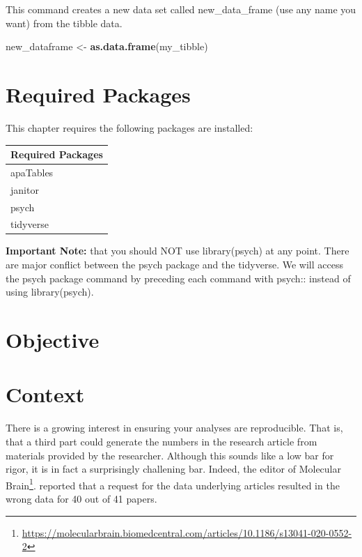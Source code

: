 \documentclass[
]{krantz}
\makeatletter
\newenvironment{Shaded}{\begin{snugshade}}{\end{snugshade}}
\newcommand{\KeywordTok}[1]{\textcolor[rgb]{0.27,0.27,0.27}{\textbf{#1}}}
\newcommand{\NormalTok}[1]{#1}
\newcommand{\StringTok}[1]{\textcolor[rgb]{0.5,0.5,0.5}{#1}}
\renewcommand{\href}[2]{#2\footnote{\url{#1}}}
\newenvironment{kframe}{%
\medskip{}
\setlength{\fboxsep}{.8em}
 \def\at@end@of@kframe{}%
 \ifinner\ifhmode%
  \def\at@end@of@kframe{\end{minipage}}%
  \begin{minipage}{\columnwidth}%
 \fi\fi%
 \def\FrameCommand##1{\hskip\@totalleftmargin \hskip-\fboxsep
 \colorbox{shadecolor}{##1}\hskip-\fboxsep
     \hskip-\linewidth \hskip-\@totalleftmargin \hskip\columnwidth}%
 \MakeFramed {\advance\hsize-\width
   \@totalleftmargin\z@ \linewidth\hsize
   \@setminipage}}%
 {\par\unskip\endMakeFramed%
 \at@end@of@kframe}
\renewenvironment{Shaded}{\begin{kframe}}{\end{kframe}}
\makeatother
\begin{document}
This command creates a new data set called new\_data\_frame (use any name you want) from the tibble data.

\begin{Shaded}
\begin{Highlighting}[]
\NormalTok{new_dataframe <-}\StringTok{ }\KeywordTok{as.data.frame}\NormalTok{(my_tibble)}
\end{Highlighting}
\end{Shaded}

\hypertarget{required-packages}{%
\section{Required Packages}\label{required-packages}}

This chapter requires the following packages are installed:

\begin{longtable}[]{@{}l@{}}
\toprule
Required Packages\tabularnewline
\midrule
\endhead
apaTables\tabularnewline
janitor\tabularnewline
psych\tabularnewline
tidyverse\tabularnewline
\bottomrule
\end{longtable}

\textbf{Important Note:} that you should NOT use library(psych) at any point. There are major conflict between the psych package and the tidyverse. We will access the psych package command by preceding each command with psych:: instead of using library(psych).

\hypertarget{objective}{%
\section{Objective}\label{objective}}

\hypertarget{context}{%
\section{Context}\label{context}}

There is a growing interest in ensuring your analyses are reproducible. That is, that a third part could generate the numbers in the research article from materials provided by the researcher. Although this sounds like a low bar for rigor, it is in fact a surprisingly challening bar. Indeed, the editor of \href{https://molecularbrain.biomedcentral.com/articles/10.1186/s13041-020-0552-2}{Molecular Brain}. reported that a request for the data underlying articles resulted in the wrong data for 40 out of 41 papers.
\end{document}
